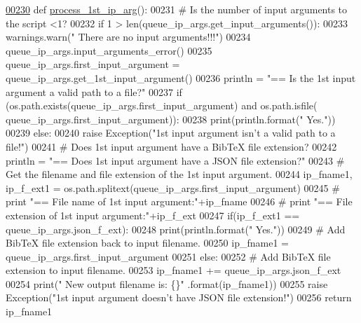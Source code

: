 \begin{DoxyCode}
\hypertarget{classutilities_1_1queue__ip__arguments_1_1queue__ip__args_l00230}{}\hyperlink{classutilities_1_1queue__ip__arguments_1_1queue__ip__args_ae1fc6d7af2e429d0656dbf388711db94}{00230}     \textcolor{keyword}{def }\hyperlink{classutilities_1_1queue__ip__arguments_1_1queue__ip__args_ae1fc6d7af2e429d0656dbf388711db94}{process\_1st\_ip\_arg}():
00231         \textcolor{comment}{#   Is the number of input arguments to the script <1?}
00232         \textcolor{keywordflow}{if} 1 > len(queue\_ip\_args.get\_input\_arguments()):
00233             warnings.warn(\textcolor{stringliteral}{" There are no input arguments!!!"})
00234             queue\_ip\_args.input\_arguments\_error()
00235         queue\_ip\_args.first\_input\_argument = queue\_ip\_args.get\_1st\_input\_argument()
00236         println = \textcolor{stringliteral}{"==   Is the 1st input argument a valid path to a file?"}
00237         \textcolor{keywordflow}{if} (os.path.exists(queue\_ip\_args.first\_input\_argument) \textcolor{keywordflow}{and} os.path.isfile(
      queue\_ip\_args.first\_input\_argument)):
00238             print(println.format(\textcolor{stringliteral}{"  Yes."}))
00239         \textcolor{keywordflow}{else}:
00240             \textcolor{keywordflow}{raise} Exception(\textcolor{stringliteral}{"1st input argument isn't a valid path to a file!"})
00241         \textcolor{comment}{#   Does 1st input argument have a BibTeX file extension?}
00242         println = \textcolor{stringliteral}{"==   Does 1st input argument have a JSON file extension?"}
00243         \textcolor{comment}{#   Get the filename and file extension of the 1st input argument.}
00244         ip\_fname1, ip\_f\_ext1 = os.path.splitext(queue\_ip\_args.first\_input\_argument)
00245 \textcolor{comment}{#   print "==   File name of 1st input argument:"+ip\_fname}
00246 \textcolor{comment}{#   print "==   File extension of 1st input argument:"+ip\_f\_ext}
00247         if(ip\_f\_ext1 == queue\_ip\_args.json\_f\_ext):
00248             print(println.format(\textcolor{stringliteral}{"  Yes."}))
00249             \textcolor{comment}{#   Add BibTeX file extension back to input filename.}
00250             ip\_fname1 = queue\_ip\_args.first\_input\_argument
00251         \textcolor{keywordflow}{else}:
00252             \textcolor{comment}{#   Add BibTeX file extension to input filename.}
00253             ip\_fname1 += queue\_ip\_args.json\_f\_ext
00254             print(\textcolor{stringliteral}{" New output filename is: \{\}"} .format(ip\_fname1))
00255             \textcolor{keywordflow}{raise} Exception(\textcolor{stringliteral}{"1st input argument doesn't have JSON file extension!"})
00256         \textcolor{keywordflow}{return} ip\_fname1
\end{DoxyCode}
\hypertarget{classutilities_1_1queue__ip__arguments_1_1queue__ip__args_a82d245379c48196f61d4268882dd5c6d}{}
